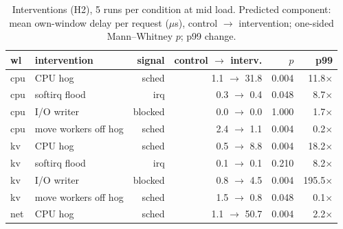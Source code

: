\begin{table}[t]\centering\caption{Interventions (H2), 5 runs per condition at mid load. Predicted component: mean own-window delay per request ($\mu$s), control $\to$ intervention; one-sided Mann--Whitney $p$; p99 change.}\label{tab:interv}\footnotesize\setlength{\tabcolsep}{2.4pt}
\begin{tabular}{llrrrr}\toprule
wl & intervention & signal & control $\to$ interv. & $p$ & p99\\\midrule
cpu & CPU hog & sched & 1.1 $\to$ 31.8 & 0.004 & 11.8$\times$ \\
cpu & softirq flood & irq & 0.3 $\to$ 0.4 & 0.048 & 8.7$\times$ \\
cpu & I/O writer & blocked & 0.0 $\to$ 0.0 & 1.000 & 1.7$\times$ \\
cpu & move workers off hog & sched & 2.4 $\to$ 1.1 & 0.004 & 0.2$\times$ \\
kv & CPU hog & sched & 0.5 $\to$ 8.8 & 0.004 & 18.2$\times$ \\
kv & softirq flood & irq & 0.1 $\to$ 0.1 & 0.210 & 8.2$\times$ \\
kv & I/O writer & blocked & 0.8 $\to$ 4.5 & 0.004 & 195.5$\times$ \\
kv & move workers off hog & sched & 1.5 $\to$ 0.8 & 0.048 & 0.1$\times$ \\
net & CPU hog & sched & 1.1 $\to$ 50.7 & 0.004 & 2.2$\times$ \\
\bottomrule\end{tabular}\end{table}

